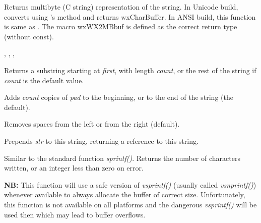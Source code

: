 Returns multibyte (C string) representation of the string.
In Unicode build, converts using 's 
method and returns wxCharBuffer. In ANSI build, this function is same
as .
The macro wxWX2MBbuf is defined as the correct return type (without const).


,
, ,

\label{wxstringmid}


Returns a substring starting at {\it first}, with length {\it count}, or the rest of
the string if {\it count} is the default value.

\label{wxstringpad}


Adds {\it count} copies of {\it pad} to the beginning, or to the end of the string (the default).

Removes spaces from the left or from the right (default).

\label{wxstringprepend}


Prepends {\it str} to this string, returning a reference to this string.

\label{wxstringprintf}


Similar to the standard function {\it sprintf()}. Returns the number of
characters written, or an integer less than zero on error.

{\bf NB:} This function will use a safe version of {\it vsprintf()} (usually called 
{\it vsnprintf()}) whenever available to always allocate the buffer of correct
size. Unfortunately, this function is not available on all platforms and the
dangerous {\it vsprintf()} will be used then which may lead to buffer overflows.

\label{wxstringprintfv}

